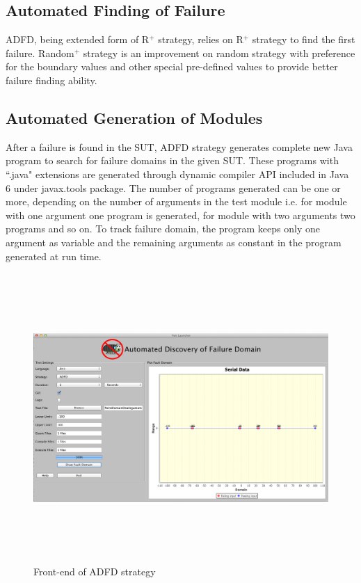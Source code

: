 \subsection{Automated Finding of Failure}
ADFD, being extended form of R$^+$ strategy, relies on R$^+$ strategy to find the first failure. Random$^+$ strategy is an improvement on random strategy with preference for the boundary values and other special pre-defined values to provide better failure finding ability. %

\subsection{Automated Generation of Modules}
After a failure is found in the SUT, ADFD strategy generates complete new Java program to search for failure domains in the given SUT.  These programs with ``.java" extensions are generated through dynamic compiler API included in Java 6 under javax.tools package. The number of programs generated can be one or more, depending on the number of arguments in the test module i.e. for module with one argument one program is generated, for module with two arguments two programs and so on. To track failure domain, the program keeps only one argument as variable and the remaining arguments as constant in the program generated at run time.

\begin{figure}[H]
\begin{center}
\includegraphics[width=15cm,height=11cm]{chapter5/ADFD_front_end.png}
\bigskip
\caption{Front-end of ADFD strategy}
\label{fig:ADFD-frontend}
\end{center}
\end{figure}
\bigskip

